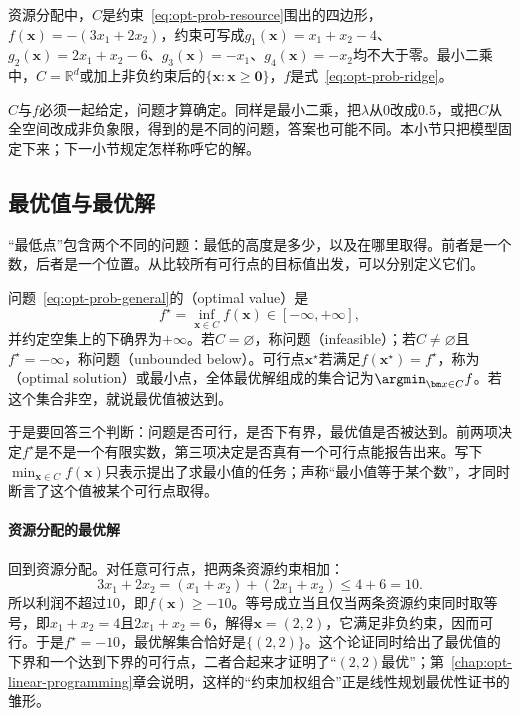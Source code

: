 资源分配中，$C$是约束~\eqref{eq:opt-prob-resource}围出的四边形，$f(\bm x)=-(3x_1+2x_2)$，约束可写成$g_1(\bm x)=x_1+x_2-4$、$g_2(\bm x)=2x_1+x_2-6$、$g_3(\bm x)=-x_1$、$g_4(\bm x)=-x_2$均不大于零。最小二乘中，$C=\mathbb R^d$或加上非负约束后的$\{\bm x:\bm x\geq\bm 0\}$，$f$是式~\eqref{eq:opt-prob-ridge}。

$C$与$f$必须一起给定，问题才算确定。同样是最小二乘，把$\lambda$从$0$改成$0.5$，或把$C$从全空间改成非负象限，得到的是不同的问题，答案也可能不同。本小节只把模型固定下来；下一小节规定怎样称呼它的解。

\subsection{最优值与最优解}
\label{sec:opt-prob-optimal-value}

“最低点”包含两个不同的问题：最低的高度是多少，以及在哪里取得。前者是一个数，后者是一个位置。从比较所有可行点的目标值出发，可以分别定义它们。

\begin{definition}[最优值与最优解]
\label{def:opt-prob-optimal-value}
问题~\eqref{eq:opt-prob-general}的（optimal value）是
\[
  f^\star=\inf_{\bm x\in C}f(\bm x)\in[-\infty,+\infty],
\]
并约定空集上的下确界为$+\infty$。若$C=\varnothing$，称问题（infeasible）；若$C\neq\varnothing$且$f^\star=-\infty$，称问题（unbounded below）。可行点$\bm x^\star$若满足$f(\bm x^\star)=f^\star$，称为（optimal solution）或最小点，全体最优解组成的集合记为$\argmin_{\bm x\in C}f$。若这个集合非空，就说最优值被达到。
\end{definition}

于是要回答三个判断：问题是否可行，是否下有界，最优值是否被达到。前两项决定$f^\star$是不是一个有限实数，第三项决定是否真有一个可行点能报告出来。写下$\min_{\bm x\in C}f(\bm x)$只表示提出了求最小值的任务；声称“最小值等于某个数”，才同时断言了这个值被某个可行点取得。

\paragraph{资源分配的最优解}
回到资源分配。对任意可行点，把两条资源约束相加：
\[
  3x_1+2x_2=(x_1+x_2)+(2x_1+x_2)\leq4+6=10.
\]
所以利润不超过$10$，即$f(\bm x)\geq-10$。等号成立当且仅当两条资源约束同时取等号，即$x_1+x_2=4$且$2x_1+x_2=6$，解得$\bm x=(2,2)$，它满足非负约束，因而可行。于是$f^\star=-10$，最优解集合恰好是$\{(2,2)\}$。这个论证同时给出了最优值的下界和一个达到下界的可行点，二者合起来才证明了“$(2,2)$最优”；第~\ref{chap:opt-linear-programming}章会说明，这样的“约束加权组合”正是线性规划最优性证书的雏形。

